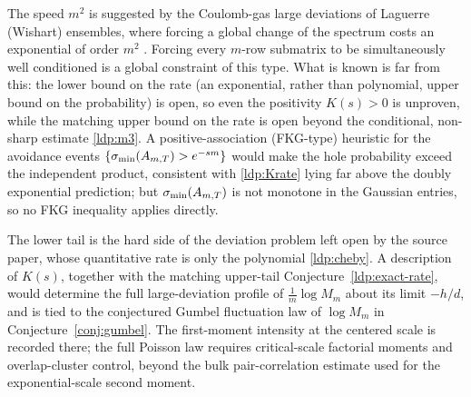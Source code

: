 The speed \(m^2\) is suggested by the Coulomb-gas large deviations of Laguerre
(Wishart) ensembles, where forcing a global change of the spectrum costs an
exponential of order \(m^2\) \cite{Forrester2010}.  Forcing every \(m\)-row
submatrix to be simultaneously well
conditioned is a global constraint of this type.  What is known is far from this:
the lower bound on the rate (an exponential, rather than polynomial, upper bound
on the probability) is open, so even the positivity \(K(s)>0\) is unproven, while
the matching upper bound on the rate is open beyond the conditional, non-sharp
estimate \eqref{ldp:m3}.  A positive-association (FKG-type) heuristic for the
avoidance events \(\{\sigma_{\min}(A_{m,T})>e^{-sm}\}\) would make the hole probability
exceed the independent product, consistent with \eqref{ldp:Krate} lying far above
the doubly exponential prediction; but \(\sigma_{\min}(A_{m,T})\) is not monotone in the
Gaussian entries, so no FKG inequality applies directly.

\begin{remark}
The lower tail is the hard side of the deviation problem left open by the source
paper, whose quantitative rate is only the polynomial \eqref{ldp:cheby}.  A
description of \(K(s)\), together with the matching upper-tail
Conjecture~\ref{ldp:exact-rate}, would determine the full large-deviation profile
of \(\tfrac1m\log M_m\) about its limit \(-h/d\), and is tied to the conjectured
Gumbel fluctuation law of \(\log M_m\) in Conjecture~\ref{conj:gumbel}.  The
first-moment intensity at the centered scale is recorded there; the full
Poisson law requires critical-scale factorial moments and overlap-cluster
control, beyond the bulk pair-correlation estimate used for the
exponential-scale second moment.
\end{remark}
